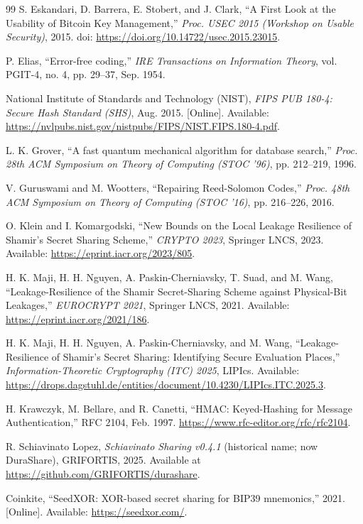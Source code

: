 \documentclass[11pt]{article}
\begin{document}
\begin{thebibliography}{99}
S. Eskandari, D. Barrera, E. Stobert, and J. Clark,
``A First Look at the Usability of Bitcoin Key Management,''
\textit{Proc. USEC 2015 (Workshop on Usable Security)}, 2015.
doi: \url{https://doi.org/10.14722/usec.2015.23015}.

P. Elias,
``Error-free coding,''
\textit{IRE Transactions on Information Theory}, vol. PGIT-4, no. 4, pp. 29--37, Sep. 1954.

National Institute of Standards and Technology (NIST),
\textit{FIPS PUB 180-4: Secure Hash Standard (SHS)}, Aug. 2015.
[Online]. Available: \url{https://nvlpubs.nist.gov/nistpubs/FIPS/NIST.FIPS.180-4.pdf}.

L. K. Grover,
``A fast quantum mechanical algorithm for database search,''
\textit{Proc. 28th ACM Symposium on Theory of Computing (STOC '96)}, pp. 212--219, 1996.

V. Guruswami and M. Wootters,
``Repairing Reed-Solomon Codes,''
\textit{Proc. 48th ACM Symposium on Theory of Computing (STOC '16)}, pp. 216--226, 2016.

O. Klein and I. Komargodski,
``New Bounds on the Local Leakage Resilience of Shamir's Secret Sharing Scheme,''
\textit{CRYPTO 2023}, Springer LNCS, 2023.
Available: \url{https://eprint.iacr.org/2023/805}.

H. K. Maji, H. H. Nguyen, A. Paskin-Cherniavsky, T. Suad, and M. Wang,
``Leakage-Resilience of the Shamir Secret-Sharing Scheme against Physical-Bit Leakages,''
\textit{EUROCRYPT 2021}, Springer LNCS, 2021.
Available: \url{https://eprint.iacr.org/2021/186}.

H. K. Maji, H. H. Nguyen, A. Paskin-Cherniavsky, and M. Wang,
``Leakage-Resilience of Shamir's Secret Sharing: Identifying Secure Evaluation Places,''
\textit{Information-Theoretic Cryptography (ITC) 2025}, LIPIcs.
Available: \url{https://drops.dagstuhl.de/entities/document/10.4230/LIPIcs.ITC.2025.3}.

H. Krawczyk, M. Bellare, and R. Canetti,
``HMAC: Keyed-Hashing for Message Authentication,''
RFC 2104, Feb. 1997. \url{https://www.rfc-editor.org/rfc/rfc2104}.

R. Schiavinato Lopez,
\textit{Schiavinato Sharing v0.4.1} (historical name; now DuraShare), GRIFORTIS, 2025.
Available at \url{https://github.com/GRIFORTIS/durashare}.

Coinkite,
``SeedXOR: XOR-based secret sharing for BIP39 mnemonics,'' 2021.
[Online]. Available: \url{https://seedxor.com/}.


\end{thebibliography}
\end{document}
